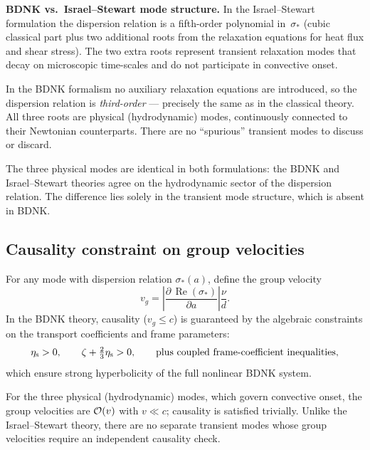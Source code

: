 \begin{relcorrection}
\textbf{BDNK vs.\ Israel--Stewart mode structure.}
In the Israel--Stewart formulation the dispersion relation is a fifth-order
polynomial in~$\sigma_*$ (cubic classical part plus two additional roots from
the relaxation equations for heat flux and shear stress).  The two extra
roots represent transient relaxation modes that decay on microscopic
time-scales and do not participate in convective onset.

In the BDNK formalism no auxiliary relaxation equations are introduced, so
the dispersion relation is \emph{third-order} --- precisely the same as in
the classical theory.  All three roots are physical (hydrodynamic) modes,
continuously connected to their Newtonian counterparts.  There are no
``spurious'' transient modes to discuss or discard.

The three physical modes are identical in both formulations: the BDNK and
Israel--Stewart theories agree on the hydrodynamic sector of the dispersion
relation.  The difference lies solely in the transient mode structure, which
is absent in BDNK.
\end{relcorrection}

\subsection{Causality constraint on group velocities}
\label{sec:rel-10d}

\begin{causalitycheck}
For any mode with dispersion relation $\sigma_*(a)$, define the group
velocity
\begin{equation}
\label{eq:rel-vg}
v_g = \left|\frac{\partial\,\operatorname{Re}(\sigma_*)}
            {\partial a}\right| \frac{\nu}{d}.
\end{equation}
In the BDNK theory, causality ($v_g \le c$) is guaranteed by the algebraic
constraints on the transport coefficients and frame parameters:
\begin{equation}
\label{eq:rel-causality-bdnk}
\eta_{\mathrm{s}} > 0, \qquad
\zeta + \tfrac{2}{3}\eta_{\mathrm{s}} > 0, \qquad
\text{plus coupled frame-coefficient inequalities},
\end{equation}
which ensure strong hyperbolicity of the full nonlinear BDNK system.

For the three physical (hydrodynamic) modes, which govern convective
onset, the group velocities are $\mathcal{O}(v)$ with $v \ll c$; causality
is satisfied trivially.  Unlike the Israel--Stewart theory, there are no
separate transient modes whose group velocities require an independent
causality check.
\end{causalitycheck}

